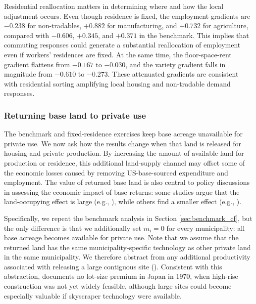\documentclass[12pt, unicode, a4paper]{article}
\newcommand{\1}{\mbox{1}\hspace{-0.25em}\mbox{l}} %
\begin{document}
Residential reallocation matters in determining where and how the local adjustment occurs. 
Even though residence is fixed, the employment gradients are $-0.238$ for non-tradables, $+0.882$ for manufacturing, and $+0.732$ for agriculture, compared with $-0.606$, $+0.345$, and $+0.371$ in the benchmark. This implies that commuting responses could generate a substantial reallocation of employment even if workers' residences are fixed. 
At the same time, the floor-space-rent gradient flattens from $-0.167$ to $-0.030$, and the variety gradient falls in magnitude from $-0.610$ to $-0.273$. These attenuated gradients are consistent with residential sorting amplifying local housing and non-tradable demand responses.


\subsubsection{Returning base land to private use}\label{sec:counterfactual_land}

The benchmark and fixed-residence exercises keep base acreage unavailable for private use. We now ask how the results change when that land is released for housing and private production. By increasing the amount of available land for production or residence, this additional land-supply channel may offset some of the economic losses caused by removing US-base-sourced expenditure and employment. The value of returned base land is also central to policy discussions in assessing the economic impact of base returns: some studies argue that the land-occupying effect is large (e.g., \citealt{okinawa07}), while others find a smaller effect (e.g., \citealt{kusuyama12}).

Specifically, we repeat the benchmark analysis in Section \ref{sec:benchmark_cf}, but the only difference is that we additionally set $m_i=0$ for every municipality: all base acreage becomes available for private use.
Note that we assume that the returned land has the same municipality-specific technology as other private land in the same municipality. We therefore abstract from any additional productivity associated with releasing a large contiguous site (\citealt{hornbeck2017creative}). Consistent with this abstraction, \citet{yamasaki2021samurai} documents no lot-size premium in Japan in 1970, when high-rise construction was not yet widely feasible, although large sites could become especially valuable if skyscraper technology were available.
\end{document}
